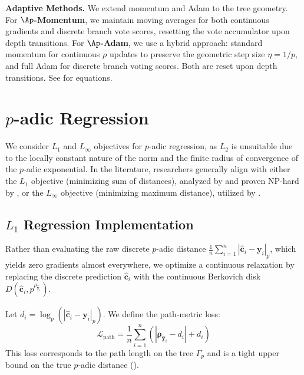 \textbf{Adaptive Methods.} We extend momentum and Adam to the tree geometry. For \textbf{$\Ap$-Momentum}, we maintain moving averages for both continuous gradients and discrete branch vote scores, resetting the vote accumulator upon depth transitions. For \textbf{$\Ap$-Adam}, we use a hybrid approach: standard momentum for continuous $\rho$ updates to preserve the geometric step size $\eta = 1/p$, and full Adam for discrete branch voting scores. Both are reset upon depth transitions. See  for equations.


\section{\texorpdfstring{$p$}{p}-adic Regression}
\label{sec:regression}

We consider $L_1$ and $L_\infty$ objectives for $p$-adic regression, as $L_2$ is unsuitable due to the locally constant nature of the norm and the finite radius of convergence of the $p$-adic exponential. In the literature, researchers generally align with either the $L_1$ objective (minimizing sum of distances), analyzed by \citet{baker2025linear, zubarev2025adic} and proven NP-hard by \citet{baker2026nphardness}, or the $L_\infty$ objective (minimizing maximum distance), utilized by \citet{martins2025learning}.

\subsection{\texorpdfstring{$L_1$}{L1} Regression Implementation}
\label{sec:l1_implementation}

Rather than evaluating the raw discrete $p$-adic distance $\frac{1}{n} \sum_{i=1}^n |\hat{\mathbf{c}}_i - \mathbf{y}_i|_p$, which yields zero gradients almost everywhere, we optimize a continuous relaxation by replacing the discrete prediction $\hat{\mathbf{c}}_i$ with the continuous Berkovich disk $D(\hat{\mathbf{c}}_i, p^{\rho_{\hat{\mathbf{y}}_i}})$. 

Let $d_i = \log_p(|\hat{\mathbf{c}}_i - \mathbf{y}_i|_p)$. We define the path-metric loss:
\begin{equation}
    \mathcal{L}_{\text{path}} = \frac{1}{n} \sum_{i=1}^n \left( |\boldsymbol{\rho}_{\hat{\mathbf{y}}_i} - d_i| + d_i \right)
\end{equation}
This loss corresponds to the path length on the tree $\Gamma_p$ and is a tight upper bound on the true $p$-adic distance ().

